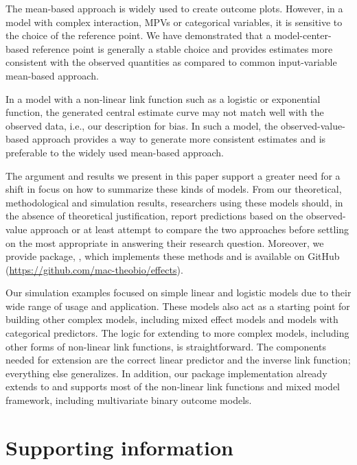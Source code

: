 The mean-based approach is widely used to create outcome plots. However, in a model with complex interaction, MPVs or categorical variables, it is sensitive to the choice of the reference point. We have demonstrated that a model-center-based reference point is generally a stable choice and provides estimates more consistent with the observed quantities as compared to common input-variable mean-based approach.

In a model with a non-linear link function such as a logistic or exponential function, the generated central estimate curve may not match well with the observed data, i.e., our description for bias. In such a model, the observed-value-based approach provides a way to generate more consistent estimates and is preferable to the widely used mean-based approach.

The argument and results we present in this paper support a greater need for a shift in focus on how to summarize these kinds of models. From our theoretical, methodological and simulation results, researchers using these models should, in the absence of theoretical justification, report predictions based on the observed-value approach or at least attempt to compare the two approaches before settling on the most appropriate in answering their research question. Moreover, we provide  package, , which implements these methods and is available on GitHub (\href{https://github.com/mac-theobio/effects}{https://github.com/mac-theobio/effects}).

Our simulation examples focused on simple linear and logistic models due to their wide range of usage and application. These models also act as a starting point for building other complex models, including mixed effect models and models with categorical predictors. The logic for extending to more complex models, including other forms of non-linear link functions, is straightforward. The components needed for extension are the correct linear predictor and the inverse link function; everything else generalizes. In addition, our  package implementation already extends to and supports most of the non-linear link functions and mixed model framework, including multivariate binary outcome models.

\section{Supporting information}

